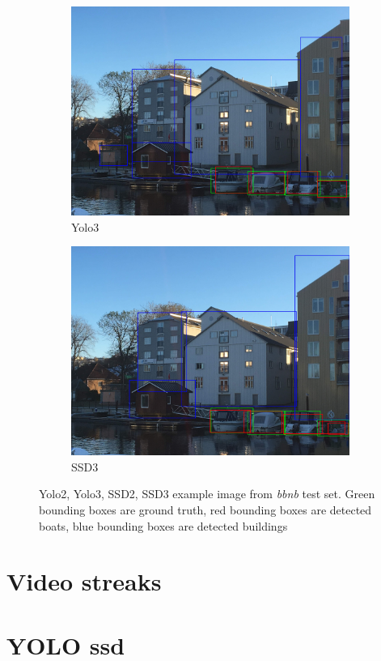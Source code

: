 \begin{figure}[h!]
\begin{subfigure}{.5\textwidth}
  \centering
  \includegraphics[width=0.8\linewidth]{results/case_buildings/prec_recall/yolo/IMG_2077_build.jpg}
  \caption{Yolo3}
  \label{fig:ex_bbnb_yolo3}
\end{subfigure}%
\begin{subfigure}{.5\textwidth}
  \centering
  \includegraphics[width=.8\linewidth]{results/case_buildings/prec_recall/ssd/IMG_2077_build.jpg}
  \caption{SSD3}
  \label{fig:ex_bbnb_ssd3}
\end{subfigure}
\caption{Yolo2, Yolo3, SSD2, SSD3 example image from \textit{bbnb} test set. Green bounding boxes are ground truth, red bounding boxes are detected boats, blue bounding boxes are detected buildings}
\label{img:bbnb_ex}
\end{figure}





\newpage

\section{Video streaks}
\section{YOLO ssd}

